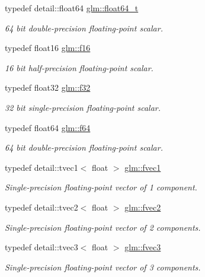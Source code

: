 \begin{DoxyCompactItemize}
typedef detail\-::float64 \hyperlink{group__gtc__type__precision_gade966a3eb25ebeb16dd53c40d3fdeb46}{glm\-::float64\-\_\-t}
\begin{DoxyCompactList}\small\item\em 64 bit double-\/precision floating-\/point scalar. \end{DoxyCompactList}\item 
typedef float16 \hyperlink{group__gtc__type__precision_ga55dd9f02a8b986348956057fd5f45c0d}{glm\-::f16}
\begin{DoxyCompactList}\small\item\em 16 bit half-\/precision floating-\/point scalar. \end{DoxyCompactList}\item 
typedef float32 \hyperlink{group__gtc__type__precision_ga0ec999b57f5330d9021256e96038df04}{glm\-::f32}
\begin{DoxyCompactList}\small\item\em 32 bit single-\/precision floating-\/point scalar. \end{DoxyCompactList}\item 
typedef float64 \hyperlink{group__gtc__type__precision_ga2bba392e555124b36cde6abba349bab3}{glm\-::f64}
\begin{DoxyCompactList}\small\item\em 64 bit double-\/precision floating-\/point scalar. \end{DoxyCompactList}\item 
typedef detail\-::tvec1$<$ float $>$ \hyperlink{group__gtc__type__precision_ga432dcb1d24c21c1b9fead0739a4af218}{glm\-::fvec1}
\begin{DoxyCompactList}\small\item\em Single-\/precision floating-\/point vector of 1 component. \end{DoxyCompactList}\item 
typedef detail\-::tvec2$<$ float $>$ \hyperlink{group__gtc__type__precision_ga68722f27c558737659b1bd1eac4d1686}{glm\-::fvec2}
\begin{DoxyCompactList}\small\item\em Single-\/precision floating-\/point vector of 2 components. \end{DoxyCompactList}\item 
typedef detail\-::tvec3$<$ float $>$ \hyperlink{group__gtc__type__precision_gaa3a8ce13ad981d1e1791070f52a885c7}{glm\-::fvec3}
\begin{DoxyCompactList}\small\item\em Single-\/precision floating-\/point vector of 3 components. \end{DoxyCompactList}\item 

\end{DoxyCompactItemize}
